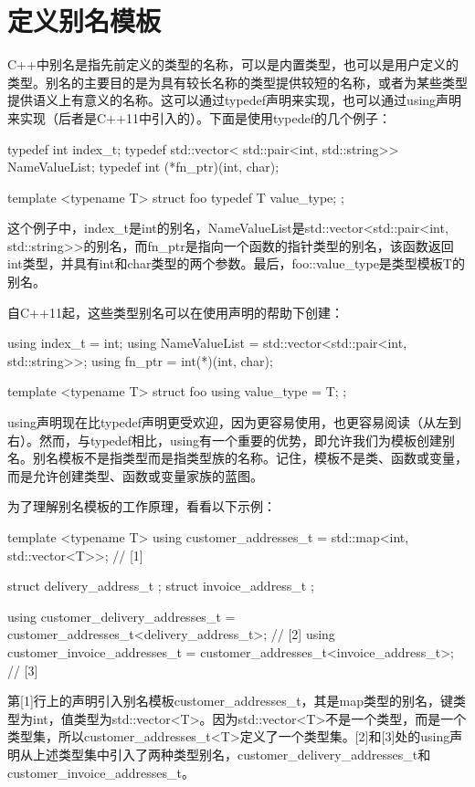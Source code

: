 \section{定义别名模板}
C++中别名是指先前定义的类型的名称，可以是内置类型，也可以是用户定义的类型。别名的主要目的是为具有较长名称的类型提供较短的名称，或者为某些类型提供语义上有意义的名称。这可以通过typedef声明来实现，也可以通过using声明来实现（后者是C++11中引入的）。下面是使用typedef的几个例子：

\begin{cpp}
typedef int index_t;
typedef std::vector<
			std::pair<int, std::string>> NameValueList;
typedef int (*fn_ptr)(int, char);

template <typename T>
struct foo
{
	typedef T value_type;
};
\end{cpp}

这个例子中，index\_t是int的别名，NameValueList是std::vector<std::pair<int, std::string>{}>的别名，而fn\_ptr是指向一个函数的指针类型的别名，该函数返回int类型，并具有int和char类型的两个参数。最后，foo::value\_type是类型模板T的别名。

自C++11起，这些类型别名可以在使用声明的帮助下创建：

\begin{cpp}
using index_t = int;
using NameValueList =
	std::vector<std::pair<int, std::string>>;
using fn_ptr = int(*)(int, char);

template <typename T>
struct foo
{
	using value_type = T;
};
\end{cpp}

using声明现在比typedef声明更受欢迎，因为更容易使用，也更容易阅读（从左到右）。然而，与typedef相比，using有一个重要的优势，即允许我们为模板创建别名。别名模板不是指类型而是指类型族的名称。记住，模板不是类、函数或变量，而是允许创建类型、函数或变量家族的蓝图。

为了理解别名模板的工作原理，看看以下示例：

\begin{cpp}
template <typename T>
using customer_addresses_t =
	std::map<int, std::vector<T>>; // [1]
	
struct delivery_address_t {};
struct invoice_address_t {};

using customer_delivery_addresses_t =
	customer_addresses_t<delivery_address_t>; // [2]
using customer_invoice_addresses_t =
	customer_addresses_t<invoice_address_t>; // [3]
\end{cpp}

第[1]行上的声明引入别名模板customer\_addresses\_t，其是map类型的别名，键类型为int，值类型为std::vector<T>。因为std::vector<T>不是一个类型，而是一个类型集，所以customer\_addresses\_t<T>定义了一个类型集。[2]和[3]处的using声明从上述类型集中引入了两种类型别名，customer\_delivery\_addresses\_t和customer\_invoice\_addresses\_t。

